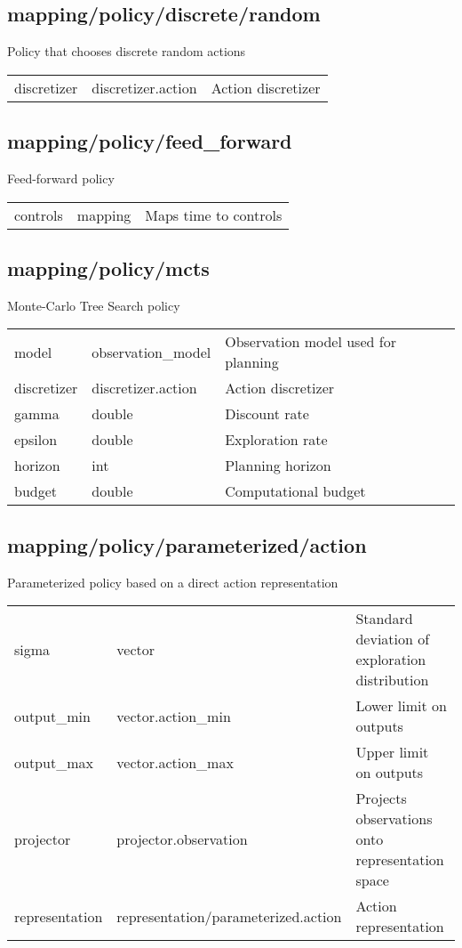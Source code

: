 \subsection{mapping/policy/discrete/random}
\noindent Policy that chooses discrete random actions\\

\noindent\begin{tabular}{@{}lll@{}}
discretizer&discretizer.action&Action discretizer\\
\end{tabular}
\subsection{mapping/policy/feed\_forward}
\noindent Feed-forward policy\\

\noindent\begin{tabular}{@{}lll@{}}
controls&mapping&Maps time to controls\\
\end{tabular}
\subsection{mapping/policy/mcts}
\noindent Monte-Carlo Tree Search policy\\

\noindent\begin{tabular}{@{}lll@{}}
model&observation\_model&Observation model used for planning\\
discretizer&discretizer.action&Action discretizer\\
gamma&double&Discount rate\\
epsilon&double&Exploration rate\\
horizon&int&Planning horizon\\
budget&double&Computational budget\\
\end{tabular}
\subsection{mapping/policy/parameterized/action}
\noindent Parameterized policy based on a direct action representation\\

\noindent\begin{tabular}{@{}lll@{}}
sigma&vector&Standard deviation of exploration distribution\\
output\_min&vector.action\_min&Lower limit on outputs\\
output\_max&vector.action\_max&Upper limit on outputs\\
projector&projector.observation&Projects observations onto representation space\\
representation&representation/parameterized.action&Action representation\\
\end{tabular}
